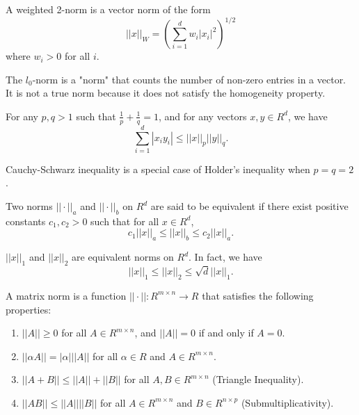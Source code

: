 \documentclass[answers,12pt,addpoints]{exam}
\begin{document}
\begin{remark}
    A weighted 2-norm is a vector norm of the form
    $$||x||_W = \left( \sum_{i=1}^{d} w_i |x_i|^2 \right)^{1/2}$$
    where $w_i > 0$ for all $i$.
\end{remark}
\begin{remark}
    The $l_0$-norm is a "norm" that counts the number of non-zero entries in a vector. It is not a true norm because it does not satisfy the homogeneity property.
\end{remark}
\begin{definition}
     For any $p, q > 1$ such that $\frac{1}{p} + \frac{1}{q} = 1$, and for any vectors $x, y \in R^d$, we have
    $$\sum_{i=1}^{d} |x_i y_i| \leq ||x||_p ||y||_q.$$

    Cauchy-Schwarz inequality is a special case of Holder's inequality when $p = q = 2$.
\end{definition}
\begin{definition}
    Two norms $||\cdot||_a$ and $||\cdot||_b$ on $R^d$ are said to be equivalent if there exist positive constants $c_1, c_2 > 0$ such that for all $x \in R^d$,
    $$c_1 ||x||_a \leq ||x||_b \leq c_2 ||x||_a.$$
    \begin{example}
        $||x||_1$ and $||x||_2$ are equivalent norms on $R^d$. In fact, we have 
        $$||x||_1 \leq ||x||_2 \leq \sqrt{d} ||x||_1.$$
    \end{example}
\end{definition}

\begin{definition}
     A matrix norm is a function $||\cdot||: R^{m \times n} \to R$ that satisfies the following properties:
    \begin{enumerate}
        \item $||A|| \geq 0$ for all $A \in R^{m \times n}$, and $||A|| = 0$ if and only if $A = 0$.
        \item $||\alpha A|| = |\alpha| ||A||$ for all $\alpha \in R$ and $A \in R^{m \times n}$.
        \item $||A + B|| \leq ||A|| + ||B||$ for all $A, B \in R^{m \times n}$ (Triangle Inequality).
        \item $||AB|| \leq ||A|| ||B||$ for all $A \in R^{m \times n}$ and $B \in R^{n \times p}$ (Submultiplicativity).
    \end{enumerate}
\end{definition}
\end{document}
